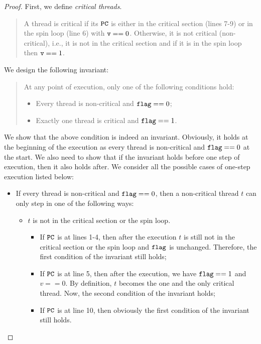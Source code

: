 \documentclass{article}[10pt]
\newcommand{\kwd}[1]{\ensuremath{\text{\ttfamily #1}}\xspace}
\def\kflag{\kwd{flag}}
\def\kv{\kwd{v}}
\begin{document}
\begin{proof}
  First, we define \emph{critical threads}. 
  \begin{quote}
    A thread is critical if its \kwd{PC} is either in the critical
    section (lines 7-9) or in the spin loop (line 6) with $\kv ==
    0$. Otherwise, it is not critical (non-critical), i.e., it is not in the critical
    section and if it is in the spin loop then $\kv == 1$.
  \end{quote}
  We design the following invariant:
  \begin{quote}
    At any point of execution, only one of the following conditions hold:
    \begin{itemize}
    \item Every thread is non-critical and $\kflag == 0$;
    \item Exactly one thread is critical and $\kflag == 1$.
    \end{itemize}
  \end{quote}
  We show that the above condition is indeed an
  invariant. Obviously, it holds at the beginning of the execution as
  every thread is non-critical and $\kflag == 0$ at the start. We also
  need to show that if the invariant holds before one step of
  execution, then it also holds after. We consider all the possible cases
  of one-step execution listed below:
  \begin{itemize}
  \item If every thread is non-critical and $\kflag == 0$, then a
    non-critical thread $t$ can only step in one of the following ways:
    \begin{itemize}
    \item $t$ is not in the critical section or the spin loop. 

      \begin{itemize}
      \item If \kwd{PC} is at lines 1-4, then after the execution $t$
        is still not in the critical section or the spin loop and
        \kflag is unchanged. Therefore, the first condition of the
        invariant still holds;

      \item If \kwd{PC} is at line 5, then after the execution, we
        have $\kflag == 1$ and $v == 0$. By definition, $t$ becomes
        the one and the only critical thread. Now, the second
        condition of the invariant holds;

      \item If \kwd{PC} is at line 10, then obviously the first
        condition of the invariant still holds.


\end{itemize}
\end{itemize}
\end{itemize}
\end{proof}
\end{document}

